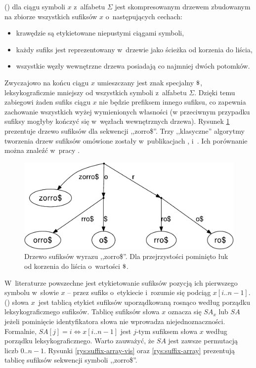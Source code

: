  () \cite{gusfield} dla ciągu symboli
$x$ z~alfabetu $\Sigma$ jest skompresowanym drzewem zbudowanym na zbiorze wszystkich sufiksów
$x$ o~następujących cechach:
\begin{itemize}
  \item krawędzie są etykietowane niepustymi ciągami symboli,
  \item każdy sufiks jest reprezentowany w~drzewie jako ścieżka od korzenia
  do liścia,
  \item wszystkie węzły wewnętrzne drzewa posiadają co najmniej dwóch
  potomków.
\end{itemize}

Zwyczajowo na końcu ciągu $x$ umieszczany jest znak specjalny $\dollar$,
leksykograficznie mniejszy od wszystkich symboli z~alfabetu $\Sigma$. Dzięki temu zabiegowi
żaden sufiks ciągu $x$ nie będzie prefiksem innego sufiksu, co zapewnia zachowanie wszystkich wyżej
wymienionych własności (w przeciwnym przypadku sufiksy mogłyby kończyć się
w~węzłach wewnętrznych drzewa). Rysunek \ref{rys:suffix-tree} prezentuje
drzewo sufiksów dla sekwencji ,,zorro\$''. Trzy ,,klasyczne'' algorytmy
tworzenia drzew sufiksów omówione zostały w~publikacjach \cite{weiner}, \cite{mccreight}
i~\cite{ukkonen}. Ich porównanie można znaleźć w~pracy \cite{from-ukkonen}.

\begin{figure}[t]
    \begin{center}
        \includegraphics[scale=0.5]{figures/zorroST.pdf}
    \end{center}
    \caption{Drzewo sufiksów wyrazu ,,zorro\$''. Dla przejrzystości pominięto łuk od korzenia do
    liścia o~wartości $\dollar$.}%
    \label{rys:suffix-tree}
\end{figure}

W~literaturze powszechne jest etykietowanie sufiksów pozycją
ich pierwszego symbolu w~słowie $x$ -- przez sufiks o~etykiecie i~rozumie
się podciąg $x[i..n-1]$.  () \cite{taxonomy} słowa $x$~jest tablicą etykiet sufiksów uporządkowaną rosnąco według porządku
leksykograficznego sufiksów.
Tablicę sufiksów słowa $x$ oznacza się $\textit{SA}_x$ lub $\textit{SA}$ jeżeli pominięcie
identyfikatora słowa nie wprowadza niejednoznaczności. Formalnie,
$\textit{SA}[j] = i \iff x[i..n-1]$ jest $j$-tym sufiksem
słowa $x$ według porządku leksykograficznego. Warto zauważyć, że
$\textit{SA}$ jest zawsze permutacją liczb $0..n-1$. Rysunki
\ref{rys:suffix-array-vis} oraz \ref{rys:suffix-array}
prezentują tablicę sufiksów sekwencji symboli ,,zorro\$''.


